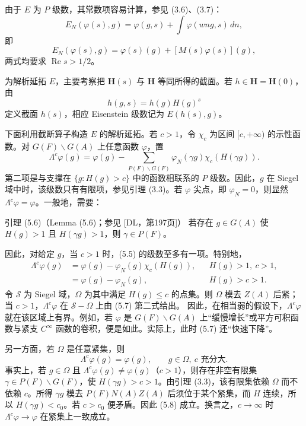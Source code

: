 由于 $E$ 为 $P$ 级数，其常数项容易计算，参见 (3.6)、(3.7)：
\[
 E_N(\varphi(s),g)=\varphi(g,s)+\int\varphi(wng,s)\,dn,
\]
即
\begin{equation}
 E_N(\varphi(s),g)=\varphi(s)(g)+[M(s)\varphi(s)](g),\tag{5.3}
\end{equation}
两式均要求 $\operatorname{Re}s>1/2$。

为解析延拓 $E$，主要考察把 $\mathbf H(s)$ 与 $\mathbf H$ 等同所得的截面。若
$h\in\mathbf H=\mathbf H(0)$，由
\begin{equation}
 h(g,s)=h(g)H(g)^s\tag{5.4}
\end{equation}
定义截面 $h(s)$，相应 Eisenstein 级数记为 $E(h(s),g)$。

下面利用截断算子构造 $E$ 的解析延拓。若 $c>1$，令 $\chi_c$ 为区间 $[c,+\infty)$ 的示性函数。对
$G(F)\backslash G(A)$ 上任意函数 $\varphi$，置
\begin{equation}
 \Lambda^c\varphi(g)=\varphi(g)
 -\sum_{P(F)\backslash G(F)}\varphi_N(\gamma g)\chi_c(H(\gamma g)).\tag{5.5}
\end{equation}
第二项是与支撑在 $\{g:H(g)>c\}$ 中的函数相联系的 $P$ 级数。因此，$g$ 在 Siegel 域中时，该级数只有有限项，参见引理 (3.3)。若 $\varphi$ 尖点，即 $\varphi_N=0$，则显然
$\Lambda^c\varphi=\varphi$。一般地，需要：
\begin{originaltheorem}{引理 (5.6)（Lemma (5.6)；参见 [DL，第197页]）}
若存在 $g\in G(A)$ 使 $H(g)>1$ 且 $H(\gamma g)>1$，则 $\gamma\in P(F)$。
\end{originaltheorem}

因此，对给定 $g$，当 $c>1$ 时，(5.5) 的级数至多有一项。特别地，
\begin{equation}
\begin{aligned}
 \Lambda^c\varphi(g)&=\varphi(g)-\varphi_N(g)\chi_c(H(g)),&&H(g)>1,\ c>1,\\
 &=\varphi(g)-\varphi_N(g),&&H(g)>c>1.
\end{aligned}\tag{5.7}
\end{equation}
令 $\mathcal S$ 为 Siegel 域，$\Omega$ 为其中满足 $H(g)\le c$ 的点集。则 $\Omega$ 模去
$Z(A)$ 后紧；当 $c>1$，$\Lambda^c\varphi$ 在 $\mathcal S-\Omega$ 上由 (5.7) 第二式给出。
因此，在相当弱的假设下，$\Lambda^c\varphi$ 就在该区域上有界。例如，若
$\varphi$ 是 $G(F)\backslash G(A)$ 上“缓慢增长”或平方可积函数与紧支 $C^\infty$ 函数的卷积，便是如此。实际上，此时 (5.7) 还“快速下降”。

另一方面，若 $\Omega$ 是任意紧集，则
\begin{equation}
 \Lambda^c\varphi(g)=\varphi(g),\qquad g\in\Omega,\ c\text{ 充分大}.\tag{5.8}
\end{equation}
事实上，若 $g\in\Omega$ 且 $\Lambda^c\varphi(g)\ne\varphi(g)$（$c>1$），则存在非空有限集
$\gamma\in P(F)\backslash G(F)$，使 $H(\gamma g)>c>1$。由引理 (3.3)，该有限集依赖
$\Omega$ 而不依赖 $c$。所得 $\gamma g$ 模去 $P(F)N(A)Z(A)$ 后须位于某个紧集，而 $H$ 连续，所以
$H(\gamma g)<c_0$。若 $c>c_0$ 便矛盾。因此 (5.8) 成立。换言之，$c\to\infty$ 时
$\Lambda^c\varphi\to\varphi$ 在紧集上一致成立。

